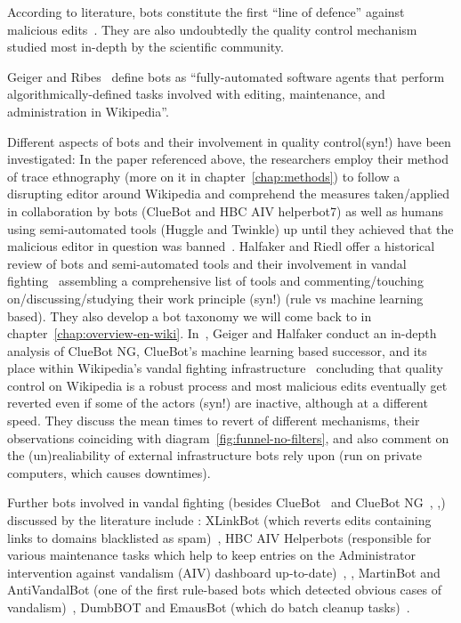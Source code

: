 According to literature, bots constitute the first ``line of defence'' against malicious edits~\cite{GeiHal2013}. %
They are also undoubtedly the quality control mechanism studied most in-depth by the scientific community.

Geiger and Ribes~\cite{GeiRib2010} define bots as
``fully-automated software
agents that perform algorithmically-defined tasks involved
with editing, maintenance, and administration in Wikipedia''.

Different aspects of bots and their involvement in quality control(syn!) have been investigated:
In the paper referenced above, the researchers employ their method of trace ethnography (more on it in chapter~\ref{chap:methods}) to follow a disrupting editor around Wikipedia and comprehend the measures taken/applied in collaboration by bots (ClueBot and HBC AIV helperbot7) as well as humans using semi-automated tools (Huggle and Twinkle) up until they achieved that the malicious editor in question was banned~\cite{GeiRib2010}.
Halfaker and Riedl offer a historical review of bots and semi-automated tools and their involvement in vandal fighting~\cite{HalRied2012} assembling a comprehensive list of tools and commenting/touching on/discussing/studying their work principle (syn!) (rule vs machine learning based).
They also develop a bot taxonomy we will come back to in chapter~\ref{chap:overview-en-wiki}. %
In~\cite{GeiHal2013}, Geiger and Halfaker conduct an in-depth analysis of ClueBot NG, ClueBot's machine learning based successor, and its place within Wikipedia's vandal fighting infrastructure~\cite{GeiHal2013} concluding that quality control on Wikipedia is a robust process and most malicious edits eventually get reverted even if some of the actors (syn!) are inactive, although at a different speed.
They discuss the mean times to revert of different mechanisms, their observations coinciding with diagram~\ref{fig:funnel-no-filters},
and also comment on the (un)realiability of external infrastructure bots rely upon (run on private computers, which causes downtimes).

Further bots involved in vandal fighting (besides ClueBot~\cite{GeiRib2010} and ClueBot NG~\cite{GeiHal2013}, \cite{HalRied2012},) discussed by the literature include :
XLinkBot (which reverts edits containing links to domains blacklisted as spam)~\cite{HalRied2012},
HBC AIV Helperbots (responsible for various maintenance tasks which help to keep entries on the Administrator intervention against vandalism (AIV) dashboard up-to-date)~\cite{HalRied2012}, \cite{GeiRib2010},
MartinBot and AntiVandalBot (one of the first rule-based bots which detected obvious cases of vandalism)~\cite{HalRied2012},
DumbBOT and EmausBot (which do batch cleanup tasks)~\cite{GeiHal2013}.

